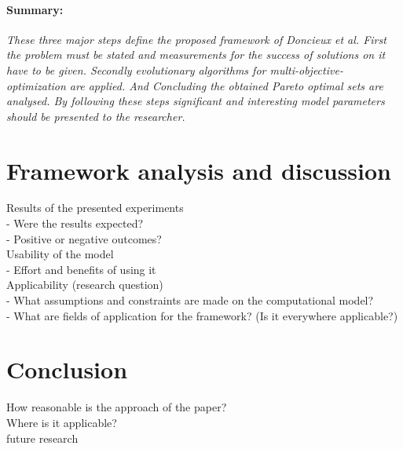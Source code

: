 \documentclass[12pt,twoside]{article}
\theoremstyle{plain}
\theoremstyle{definition}
\theoremstyle{remark}
\begin{document}
\paragraph{Summary:}
\textit{
	These three major steps define the proposed framework of Doncieux et al.
	First the problem must be stated and measurements for the success of solutions on it have to be given. Secondly evolutionary algorithms for multi-objective-optimization are applied. And Concluding the obtained Pareto optimal sets are analysed.
	By following these steps significant and interesting model parameters should be presented to the researcher.
}

\section{Framework analysis and discussion}
\label{sec:analysis}

Results of the presented experiments\\
- Were the results expected?\\
- Positive or negative outcomes?\\
Usability of the model\\
- Effort and benefits of using it\\
Applicability (research question)\\
- What assumptions and constraints are made on the computational model?\\
- What are fields of application for the framework? (Is it everywhere applicable?)\\

\section{Conclusion}
\label{sec:concl}

How reasonable is the approach of the paper?\\
Where is it applicable?\\
future research

%
%
\newpage


\end{document}
